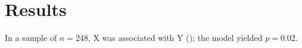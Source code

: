 \section{Results}
In a sample of $n=248$, X was associated with Y (\cite{Li2024}); the model yielded $p=0.02$.
